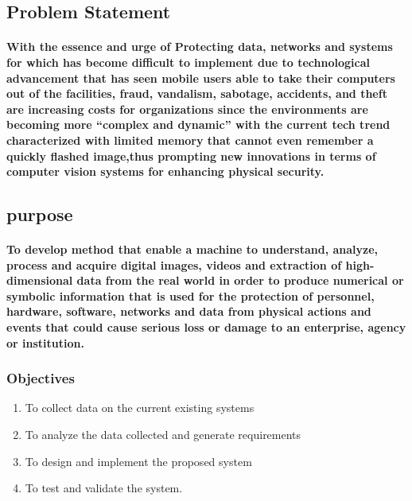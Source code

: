 \documentclass[11pt]{article}
\begin{document}
	 \subsection{\textbf{Problem Statement}}
	 
	 \paragraph{\textmd{With the essence and urge of Protecting data, networks and systems for which has become difficult to implement due to technological advancement that has seen mobile users able to take their computers out of the facilities, fraud, vandalism, sabotage, accidents, and theft are increasing costs for organizations since the environments are becoming more “complex and dynamic” with the current tech trend characterized with limited memory that cannot even remember a quickly flashed image,thus prompting new innovations in terms of computer vision systems for enhancing physical security.}}
	 
	 \subsection{\textbf{purpose}}
	 
	   \paragraph{\textmd{To develop method that enable a machine to understand, analyze, process and acquire digital images, videos and extraction of high-dimensional data from the real world in order to produce numerical or symbolic information that is used for the protection of personnel, hardware, software, networks and data from physical actions and events that could cause serious loss or damage to an enterprise, agency or institution.}}
	   
	   \subsubsection{\textbf{ Objectives}}
	   
	   \begin{enumerate}
	   
	   \item To collect data on the current existing systems
	   \item To analyze the data collected and generate requirements
	   \item To design and implement the proposed system 
	   \item To test and validate the system.
	           
	   \end{enumerate} 	  
 
\end{document}
